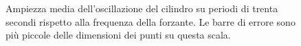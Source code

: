 \documentclass[italian,a4paper]{article}
\begin{document}
\begin{figure}[p]\caption{Ampiezza media dell'oscillazione del cilindro su periodi di trenta secondi rispetto alla frequenza della forzante. Le barre di errore sono più piccole delle dimensioni dei punti su questa scala.}\label{ampiezzegraf}
\centering

\end{figure}
% 
% 
% 
% 
\end{document}

